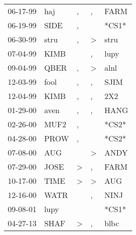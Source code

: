 \begin{supertabular}{p{0.07\textwidth}p{0.06\textwidth}p{0.02\textwidth}p{0.02\textwidth}p{0.06\textwidth}}
 06-17-99\textsuperscript{} &   haj\textsuperscript{} &             , &             , &  FARM\textsuperscript{} \\
 06-19-99\textsuperscript{} &  SIDE\textsuperscript{} &             , &               &                   *CS1* \\
 06-30-99\textsuperscript{} &  stru\textsuperscript{} &             , &  \textgreater &  stru\textsuperscript{} \\
 07-04-99\textsuperscript{} &  KIMB\textsuperscript{} &               &             , &  lupy\textsuperscript{} \\
 09-04-99\textsuperscript{} &  QBER\textsuperscript{} &             , &  \textgreater &  alnl\textsuperscript{} \\
 12-03-99\textsuperscript{} &  fool\textsuperscript{} &             , &             , &  SJIM\textsuperscript{} \\
 12-04-99\textsuperscript{} &  KIMB\textsuperscript{} &             , &             , &   2X2\textsuperscript{} \\
 01-29-00\textsuperscript{} &  aven\textsuperscript{} &             , &             , &  HANG\textsuperscript{} \\
 02-26-00\textsuperscript{} &  MUF2\textsuperscript{} &             , &               &                   *CS2* \\
 04-28-00\textsuperscript{} &  PROW\textsuperscript{} &             , &               &                   *CS2* \\
 07-08-00\textsuperscript{} &   AUG\textsuperscript{} &               &  \textgreater &  ANDY\textsuperscript{} \\
 07-29-00\textsuperscript{} &  JOSE\textsuperscript{} &  \textgreater &             , &  FARM\textsuperscript{} \\
 10-17-00\textsuperscript{} &  TIME\textsuperscript{} &  \textgreater &  \textgreater &   AUG\textsuperscript{} \\
 12-16-00\textsuperscript{} &  WATR\textsuperscript{} &               &             , &  NINJ\textsuperscript{} \\
 09-08-01\textsuperscript{} &  lupy\textsuperscript{} &               &               &                   *CS1* \\
 04-27-13\textsuperscript{} &  SHAF\textsuperscript{} &  \textgreater &             , &  blbc\textsuperscript{} \\
\end{supertabular}
